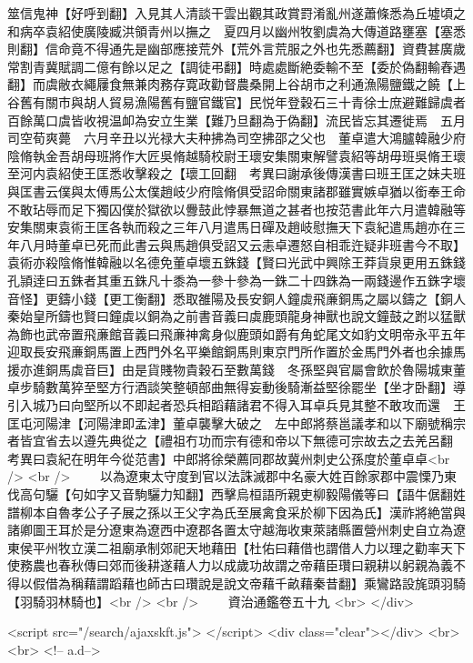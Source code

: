 筮信鬼神【好呼到翻】入見其人清談干雲出觀其政賞罸淆亂州遂蕭條悉為丘墟頃之和病卒袁紹使廣陵臧洪領青州以撫之　夏四月以幽州牧劉虞為大傳道路壅塞【塞悉則翻】信命竟不得通先是幽部應接荒外【荒外言荒服之外也先悉薦翻】資費甚廣歲常割青冀賦調二億有餘以足之【調徒弔翻】時處處斷絶委輸不至【委於偽翻輸舂遇翻】而虞敝衣繩屨食無兼肉務存寛政勸督農桑開上谷胡市之利通漁陽鹽鐵之饒【上谷舊有關市與胡人貿易漁陽舊有鹽官鐵官】民悦年登穀石三十青徐士庶避難歸虞者百餘萬口虞皆收視温卹為安立生業【難乃旦翻為于偽翻】流民皆忘其遷徙焉　五月司空荀爽薨　六月辛丑以光禄大夫种拂為司空拂邵之父也　董卓遣大鴻臚韓融少府陰脩執金吾胡母班將作大匠吳脩越騎校尉王瓌安集關東解譬袁紹等胡毋班吳脩王瓌至河内袁紹使王匡悉收擊殺之【瓌工回翻　考異曰謝承後傳漢書曰班王匡之妹夫班與匡書云僕與太傅馬公太僕趙岐少府陰脩俱受詔命關東諸郡雖實嫉卓猶以銜奉王命不敢玷辱而足下獨囚僕於獄欲以釁鼓此悖暴無道之甚者也按范書此年六月遣韓融等安集關東袁術王匡各執而殺之三年八月遣馬日磾及趙岐慰撫天下袁紀遣馬趙亦在三年八月時董卓已死而此書云與馬趙俱受詔又云恚卓遷怒自相乖迕疑非班書今不取】袁術亦殺陰脩惟韓融以名德免董卓壞五銖錢【賢曰光武中興除王莽貨泉更用五銖錢孔頴逹曰五銖者其重五銖凡十黍為一參十參為一銖二十四銖為一兩錢邊作五銖字壞音怪】更鑄小錢【更工衡翻】悉取雒陽及長安銅人鐘虡飛亷銅馬之屬以鑄之【銅人秦始皇所鑄也賢曰鐘虡以銅為之前書音義曰虡鹿頭龍身神獸也說文鐘鼓之跗以猛獸為飾也武帝置飛亷館音義曰飛亷神禽身似鹿頭如爵有角蛇尾文如豹文明帝永平五年迎取長安飛亷銅馬置上西門外名平樂館銅馬則東京門所作置於金馬門外者也余據馬援亦進銅馬虡音巨】由是貨賤物貴穀石至數萬錢　冬孫堅與官屬會飲於魯陽城東董卓步騎數萬猝至堅方行酒談笑整頓部曲無得妄動後騎漸益堅徐罷坐【坐才卧翻】導引入城乃曰向堅所以不即起者恐兵相蹈藉諸君不得入耳卓兵見其整不敢攻而還　王匡屯河陽津【河陽津即孟津】董卓襲擊大破之　左中郎將蔡邕議孝和以下廟號稱宗者皆宜省去以遵先典從之【禮祖冇功而宗有德和帝以下無德可宗故去之去羌呂翻　考異曰袁紀在明年今從范書】中郎將徐榮薦同郡故冀州刺史公孫度於董卓卓<br />
<br />
　　以為遼東太守度到官以法誅滅郡中名豪大姓百餘家郡中震慄乃東伐高句驪【句如字又音駒驪力知翻】西擊烏桓語所親吏柳毅陽儀等曰【語牛倨翻姓譜柳本自魯孝公子子展之孫以王父字為氏至展禽食采於柳下因為氏】漢祚將絶當與諸卿圖王耳於是分遼東為遼西中遼郡各置太守越海收東萊諸縣置營州刺史自立為遼東侯平州牧立漢二祖廟承制郊祀天地藉田【杜佑曰藉借也謂借人力以理之勸率天下使務農也春秋傳曰郊而後耕遂藉人力以成歲功故謂之帝藉臣瓚曰親耕以躬親為義不得以假借為稱藉謂蹈藉也師古曰瓚說是說文帝藉千畝藉秦昔翻】乘鸞路設旄頭羽騎【羽騎羽林騎也】<br />
<br />
　　資治通鑑卷五十九  <br>
   </div> 

<script src="/search/ajaxskft.js"> </script>
 <div class="clear"></div>
<br>
<br>
 <!-- a.d-->

